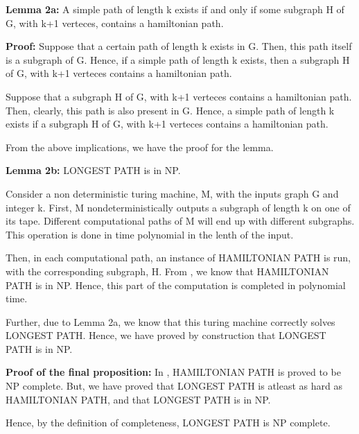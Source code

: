 \documentclass[10pt]{article}
\begin{document}
\textbf{Lemma 2a:} A simple path of length k exists if and only if some subgraph H of G, with k+1 verteces, contains a hamiltonian path.

\textbf{Proof:}
Suppose that a certain path of length k exists in G. Then, this path itself is a subgraph of G. Hence, if a simple path of length k exists, then a subgraph H of G, with k+1 verteces contains a hamiltonian path.

Suppose that a subgraph H of G, with k+1 verteces contains a hamiltonian path. Then, clearly, this path is also present in G. Hence, a simple path of length k exists if a subgraph H of G, with k+1 verteces contains a hamiltonian path.

From the above implications, we have the proof for the lemma.

\textbf{Lemma 2b:} LONGEST PATH is in NP.

Consider a non deterministic turing machine, M, with the inputs graph G and integer k. First, M nondeterministically outputs a subgraph of length k on one of its tape. Different computational paths of M will end up with different subgraphs. This operation is done in time polynomial in the lenth of the input.

Then, in each computational path, an instance of HAMILTONIAN PATH is run, with the corresponding subgraph, H. From \cite{papadimitriouCC}, we know that HAMILTONIAN PATH is in NP. Hence, this part of the computation is completed in polynomial time.

Further, due to Lemma 2a, we know that this turing machine correctly solves LONGEST PATH. Hence, we have proved by construction that LONGEST PATH is in NP.

\textbf{Proof of the final proposition:}
In \cite{papadimitriouCC}, HAMILTONIAN PATH is proved to be NP complete. But, we have proved that LONGEST PATH is atleast as hard as HAMILTONIAN PATH, and that LONGEST PATH is in NP.

Hence, by the definition of completeness, LONGEST PATH is NP complete.



\end{document}
